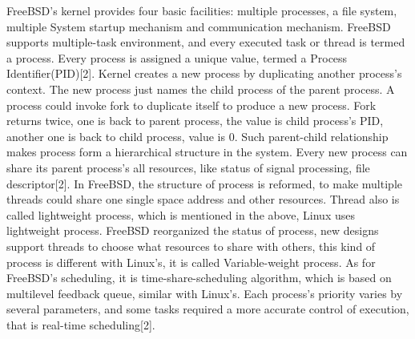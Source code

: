 \documentclass[10pt,draftclsnofoot,peerreview,letterpaper,onecolumn,]{IEEEtran}
\begin{document}
FreeBSD's kernel provides four basic facilities: multiple processes, a file system, multiple System startup mechanism and communication mechanism. FreeBSD supports multiple-task environment, and every executed task or thread is termed a process. Every process is assigned a unique value, termed a Process Identifier(PID)[2]. Kernel creates a new process by duplicating another process's context. The new process just names the child process of the parent process. A process could invoke fork to duplicate itself to produce a new process. Fork returns twice, one is back to parent process, the value is child process's PID, another one is back to child process, value is 0. Such parent-child relationship makes process form a hierarchical structure in the system. Every new process can share its parent process’s all resources, like status of signal processing, file descriptor[2]. In FreeBSD, the structure of process is reformed, to make multiple threads could share one single space address and other resources. Thread also is called lightweight process, which is mentioned in the above, Linux uses lightweight process. FreeBSD reorganized the status of process, new designs support threads to choose what resources to share with others, this kind of process is different with Linux's, it is called Variable-weight process. As for FreeBSD's scheduling, it is time-share-scheduling algorithm, which is based on multilevel feedback queue, similar with Linux's. Each process's priority varies by several parameters, and some tasks required a more accurate control of execution, that is real-time scheduling[2].
\end{document}
